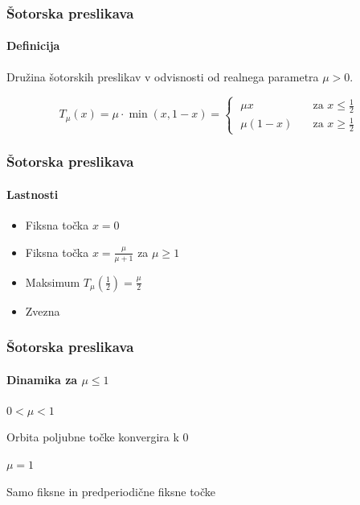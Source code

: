 \documentclass[12pt]{beamer}
\begin{document}
\begin{frame}
\frametitle{Šotorska preslikava}
\framesubtitle{Definicija}

Družina šotorskih preslikav v odvisnosti od realnega parametra $\mu > 0$.

\medskip

\begin{equation*}
T_\mu(x) = \mu \cdot \min(x, 1-x) =
\begin{cases}
    \;\mu x       &\quad \text{za } x \leq \frac{1}{2} \\
    \;\mu (1-x)   &\quad \text{za } x \geq \frac{1}{2}
\end{cases}
\end{equation*}

\end{frame}


\begin{frame}
\frametitle{Šotorska preslikava}
\framesubtitle{Lastnosti}

\begin{figure}[h!]  
\centering 
{}
\end{figure} 

\begin{itemize}
    \item Fiksna točka $x=0$
    \item Fiksna točka $x=\frac{\mu}{\mu+1}$ za $\mu \geq 1$
    \item Maksimum $T_\mu(\frac{1}{2}) = \frac{\mu}{2}$
    \item Zvezna
\end{itemize}

\end{frame}


\begin{frame}
\frametitle{Šotorska preslikava}
\framesubtitle{Dinamika za $\mu \leq 1$}

$0 < \mu < 1$

\smallskip

Orbita poljubne točke konvergira k $0$

\vspace{2\baselineskip}

$\mu = 1$

\smallskip

Samo fiksne in predperiodične fiksne točke

\end{frame}
\end{document}
